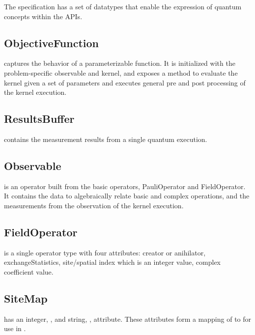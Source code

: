 The \qcor specification has a set of datatypes that enable the expression of quantum concepts within the \qcor \ac{API}s.\\

\subsection{\textbf{ObjectiveFunction}}\label{subsec:ObjectiveFunction}
 captures the behavior of a parameterizable function. It is initialized with the problem-specific observable and kernel, and exposes a method to evaluate the kernel given a set of parameters and executes general pre and post processing of the kernel execution.\\

\subsection{\textbf{ResultsBuffer}}\label{subsec:ResultsBuffer}
 contains the measurement results from a single quantum execution.\\

\subsection{\textbf{Observable}}\label{subsec:Observable}
 is an operator built from the basic operators, PauliOperator and FieldOperator. It contains the data to algebraically relate basic and complex operations, and the measurements from the observation of the kernel execution.\\


\subsection{\textbf{FieldOperator}}\label{subsec:FieldOperator}
 is a single operator type with four attributes: creator or anihilator, exchangeStatistics, site/spatial index which is an integer value, complex coefficient value.\\

\subsection{\textbf{SiteMap}}\label{subsec:Sitemap}
 has an integer, , and string, , attribute. These attributes form a mapping of  to  for use in \Clang.


